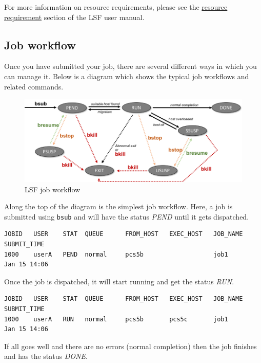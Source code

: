 \documentclass[11pt]{article}
\makeatletter
\def\maxwidth{\ifdim\Gin@nat@width>\linewidth\linewidth
    \else\Gin@nat@width\fi}
\let\Oldincludegraphics\includegraphics
\renewcommand{\includegraphics}[1]{\Oldincludegraphics[width=.8\maxwidth, height=.55\textheight, keepaspectratio]{#1}}
\makeatother
\begin{document}
For more information on resource requirements, please see the
\href{https://www.ibm.com/support/knowledgecenter/SSETD4_9.1.3/lsf_admin/res_req_strings_about.html}{resource
requirement} section of the LSF user manual.


    \subsection{Job workflow}\label{job-workflow}

Once you have submitted your job, there are several different ways in
which you can manage it. Below is a diagram which shows the typical job
workflows and related commands.

    \begin{figure}[!h]
\centering
\includegraphics{images/lsf_workflow.png}
\caption{LSF job workflow}
\end{figure}

    Along the top of the diagram is the simplest job workflow. Here, a job
is submitted using \texttt{bsub} and will have the status \textit{PEND}
until it gets dispatched.

    \begin{verbatim}
JOBID   USER    STAT  QUEUE      FROM_HOST   EXEC_HOST   JOB_NAME   SUBMIT_TIME
1000    userA   PEND  normal     pcs5b                   job1       Jan 15 14:06
\end{verbatim}

    Once the job is dispatched, it will start running and get the status
\textit{RUN}.

    \begin{verbatim}
JOBID   USER    STAT  QUEUE      FROM_HOST   EXEC_HOST   JOB_NAME   SUBMIT_TIME
1000    userA   RUN   normal     pcs5b       pcs5c       job1       Jan 15 14:06
\end{verbatim}

    If all goes well and there are no errors (normal completion) then the
job finishes and has the status \textit{DONE}.
\end{document}
